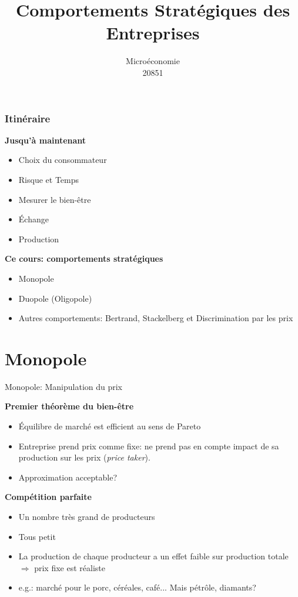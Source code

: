 \documentclass[handout]{beamer}
\title{Comportements Stratégiques des Entreprises}
\author{Microéconomie \\ 20851}
\date{}
\newenvironment{iPar}[1]{\textbf{#1} \begin{itemize}}{\end{itemize}}
\newcommand{\mdp}{\medskip \pause}
\begin{document}
\frame{\titlepage}

\begin{frame}\frametitle{Itinéraire}

\begin{iPar}{Jusqu'à maintenant}
\item Choix du consommateur
\item Risque et Temps
\item Mesurer le bien-être
\item Échange
\item Production
\end{iPar}\mdp

\begin{iPar}{Ce cours: comportements stratégiques}
\item Monopole
\item Duopole (Oligopole)
\item Autres comportements: Bertrand, Stackelberg et Discrimination par les prix

\end{iPar}\mdp


\end{frame}

\section[Outline]{}
\frame{\tableofcontents}

\section{Monopole}

\begin{frame}{Monopole: Manipulation du prix}

\begin{iPar}{Premier théorème du bien-être} \item Équilibre de marché est efficient au sens de Pareto \item Entreprise prend prix comme fixe: ne prend pas en compte impact de sa production sur les prix (\textit{price taker}).
\item Approximation acceptable? \end{iPar} \mdp

\begin{iPar}{Compétition parfaite} \item Un nombre très grand de producteurs \item
Tous petit \item La production de chaque producteur a un effet faible sur production totale $\Rightarrow$ prix fixe est réaliste \item e.g.: marché pour le porc, céréales, café... Mais pétrôle, diamants? \end{iPar}

\end{frame}
\end{document}
